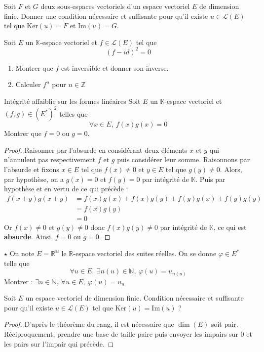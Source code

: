 \documentclass[french,a4paper]{article}
\newcommand{\N}{\mathbb{N}}
\newcommand{\Z}{\mathbb{Z}}
\newcommand{\R}{\mathbb{R}}
\newcommand{\K}{\mathbb{K}}
\newcommand{\st}{^*}
\renewcommand{\ker}{\text{Ker}}
\newcommand{\im}{\text{Im}}
\theoremstyle{plain}
\theoremstyle{definition}
\theoremstyle{remark}
\begin{document}
\begin{ex}[Moulin.32]{}
	Soit $F$ et $G$ deux sous-espaces vectoriels d'un espace vectoriel $E$ de dimension finie. Donner une condition nécessaire et suffisante pour qu'il existe $u\in\mathcal{L}(E)$ tel que $\ker(u)=F$ et $\text{Im}(u)=G$.
\end{ex}

\begin{ex}[]{}
	Soit $E$ un $\K$-espace vectoriel et $f\in\mathcal{L}(E)$ tel que $$(f-id)^2=0$$ 
	\begin{enumerate}
		\item Montrer que $f$ est inversible et donner son inverse.
		\item Calculer $f^n$ pour $n \in \Z$
	\end{enumerate}
\end{ex}

\begin{ex}{Intégrité affaiblie sur les formes linéaires}
	Soit $E$ un $\K$-espace vectoriel et $(f,g) \in (E\st)^2$ telles que $$\forall x \in E, \ f(x)g(x)=0$$ Montrer que $f=0$ ou $g=0$.
\end{ex}
\begin{proof}
	Raisonner par l'absurde en considérant deux éléments $x$ et $y$ qui n'annulent pas respectivement $f$ et $g$ puis considérer leur somme. Raisonnons par l'absurde et fixons $x \in E$ tel que $f(x)\ne0$ et $y \in E$ tel que $g(y)\ne0$. Alors, par hypothèse, on a $g(x)=0$ et $f(y)=0$ par intégrité de $\K$. Puis par hypothèse et en vertu de ce qui précède :
	\begin{align*}
		f(x+y)g(x+y) & = f(x)g(x)+f(x)g(y)+f(y)g(x)+f(y)g(y) \\
		& =f(x)g(y) \\
		& = 0
	\end{align*}
	Or $f(x)\ne0$ et $g(y)\ne0$ donc $f(x)g(y)\ne0$ par intégrité de $\K$, ce qui est \textbf{absurde}. Ainsi, $f=0$ ou $g=0$.
\end{proof}

\begin{ex}[Morlot]{$\star$}
	On note $E=\R^\N$ le $\R$-espace vectoriel des suites réelles. On se donne $\varphi\in E\st$ telle que $$\forall u\in E,\ \exists n(u)\in \N,\ \varphi(u)=u_{n(u)}$$ Montrer : $\exists n\in\N,\ \forall u\in E,\ \varphi(u)=u_n$
\end{ex}

\begin{ex}[Moulin.33]{}
	Soit $E$ un espace vectoriel de dimension finie. Condition nécessaire et suffisante pour qu'il existe $u\in\mathcal{L}(E)$ tel que $\ker(u)=\im(u)$ ?
\end{ex}
\begin{proof}
	D'après le théorème du rang, il est nécessaire que $\dim(E)$ soit pair. Réciproquement, prendre une base de taille paire puis envoyer les impairs sur $0$ et les pairs sur l'impair qui précède.
\end{proof}
\end{document}
